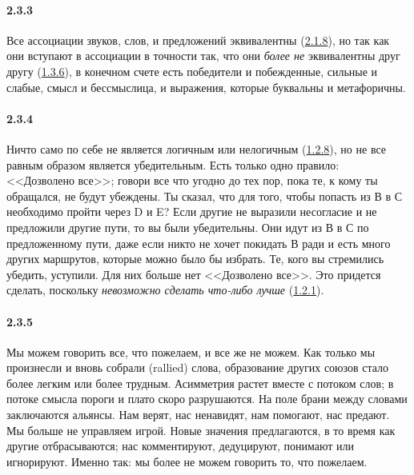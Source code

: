 \paragraph{2.3.3}\hypertarget{par:2.3.3}{} Все ассоциации звуков, слов, и предложений эквивалентны (\hyperlink{par:2.1.8}{2.1.8}), но так как они вступают в ассоциации в точности так, что они {\itshape более не} эквивалентны друг другу (\hyperlink{par:1.3.6}{1.3.6}), в конечном счете есть победители и побежденные, сильные и слабые, смысл и бессмыслица, и выражения, которые буквальны и метафоричны.

\paragraph{2.3.4}\hypertarget{par:2.3.4}{} Ничто само по себе не является логичным или нелогичным (\hyperlink{par:1.2.8}{1.2.8}), но не все равным образом является убедительным. Есть только одно правило: <<Дозволено все>>; говори все что угодно до тех пор, пока те, к кому ты обращался, не будут убеждены. Ты сказал, что для того, чтобы попасть из В в С необходимо пройти через D и E? Если другие не выразили несогласие и не предложили другие пути, то вы были убедительны. Они идут из В в С по предложенному пути, даже если никто не хочет покидать В ради и есть много других маршрутов, которые можно было бы избрать. Те, кого вы стремились убедить, уступили. Для них больше нет <<Дозволено все>>. Это придется сделать, поскольку {\itshape невозможно сделать что-либо лучше} (\hyperlink{par:1.2.1}{1.2.1}).

\paragraph{2.3.5}\hypertarget{par:2.3.5}{} Мы можем говорить все, что пожелаем, и все же не можем. Как только мы произнесли и вновь собрали (rallied) слова, образование других союзов стало более легким или более трудным. Асимметрия растет вместе с потоком слов; в потоке смысла пороги и плато скоро разрушаются. На поле брани между словами заключаются альянсы. Нам верят, нас ненавидят, нам помогают, нас предают. Мы больше не управляем игрой. Новые значения предлагаются, в то время как другие отбрасываются; нас комментируют, дедуцируют, понимают или игнорируют. Именно так: мы более не можем говорить то, что пожелаем.

